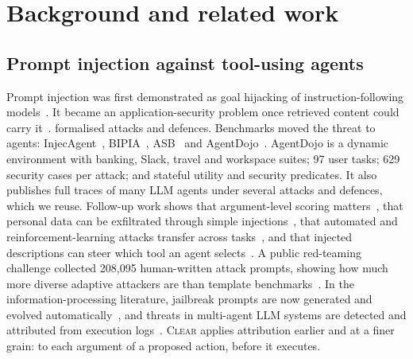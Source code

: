 \documentclass[preprint,12pt,nonatbib]{elsarticle}
\theoremstyle{remark}
\newcommand{\clear}{\textsc{Clear}}
\begin{document}
\section{Background and related work}
\label{sec:related}

\subsection{Prompt injection against tool-using agents}
Prompt injection was first demonstrated as goal hijacking of instruction-following
models~\citep{perez2022ignore}. It became an application-security problem once
retrieved content could carry it~\citep{greshake2023not,liu2023houyi}.
\citet{liu2024formalizing} formalised attacks and defences. Benchmarks moved the
threat to agents: InjecAgent~\citep{zhan2024injecagent}, BIPIA~\citep{yi2025bipia},
ASB~\citep{zhang2025asb} and AgentDojo~\citep{debenedetti2024agentdojo}. AgentDojo
is a dynamic environment with banking, Slack, travel and workspace suites; 97
user tasks; 629 security cases per attack; and stateful utility and security
predicates. It also publishes full traces of many LLM agents under several
attacks and defences, which we reuse. Follow-up work shows that
argument-level scoring matters~\citep{shaw2026silent}, that personal data can be
exfiltrated through simple injections~\citep{alizadeh2025simple}, that
automated and reinforcement-learning attacks transfer across
tasks~\citep{hofer2026automated,chen2026autoinject}, and that injected
descriptions can steer which tool an agent selects~\citep{shi2026toolselection}.
A public red-teaming challenge collected 208{,}095 human-written attack prompts,
showing how much more diverse adaptive attackers are than template
benchmarks~\citep{abdelnabi2026llmail}. In the information-processing
literature, jailbreak prompts are now generated and evolved
automatically~\citep{liu2026seattack,tang2026evojail}, and threats in
multi-agent LLM systems are detected and attributed from execution
logs~\citep{rabieinejad2026logs}. \clear{} applies attribution earlier and at a
finer grain: to each argument of a proposed action, before it executes.
\end{document}
